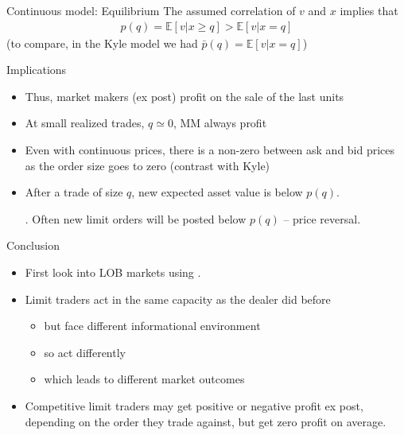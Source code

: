 \documentclass[english,10pt
,aspectratio=169
]{beamer}
\begin{document}
\begin{frame}{Continuous model: Equilibrium}
The assumed correlation of $v$ and $x$ implies that
\begin{align}
	p(q) = \mathbb{E}[v|x \geq q] > \mathbb{E}[v|x = q]
\end{align}
(to compare, in the Kyle model we had 
\pause 
$\bar{p}(q) = \mathbb{E}[v|x = q]$)
\pause
\begin{block}{Implications}
	\begin{itemize}
		\item Thus, market makers (ex post) profit on the sale of the last units
		\item At small realized trades, $q \simeq 0$, MM always profit
		\item Even with continuous prices, there is a non-zero  between ask and bid prices as the order size goes to zero (contrast with Kyle)
		\item After a trade of size $q$, new expected asset value is below $p(q)$. \pause 
		
		. Often new limit orders will be posted below $p(q)$ -- price reversal.
	\end{itemize}
\end{block}
\end{frame}


\begin{frame}{Conclusion}
	\begin{itemize}
		\item First look into LOB markets using \cite{glosten_is_1994}.
		\item Limit traders act in the same capacity as the dealer did before
		\begin{itemize}
			\item but face different \alert{informational environment}
			\item so act differently
			\item which leads to different market outcomes
		\end{itemize}
		\item Competitive limit traders may get positive or negative profit ex post, depending on the order they trade against, but get zero profit on average.
	\end{itemize}
\end{frame}
\end{document}
